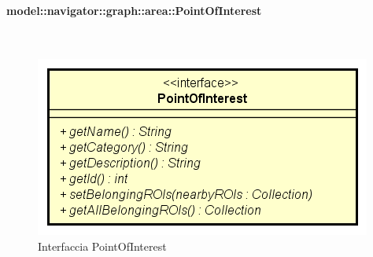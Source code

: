 \documentclass[../DefinizioneDiProdotto.tex]{subfiles}
\begin{document}
\paragraph{model::navigator::graph::area::PointOfInterest}
\
\begin{figure}[H]
	\centering
	\includegraphics[width=\maxwidth]{img/PointOfInterest.png}
	\caption{Interfaccia PointOfInterest}\label{fig:model::navigator::graph::area::PointOfInterest} 
\end{figure}
\end{document}
